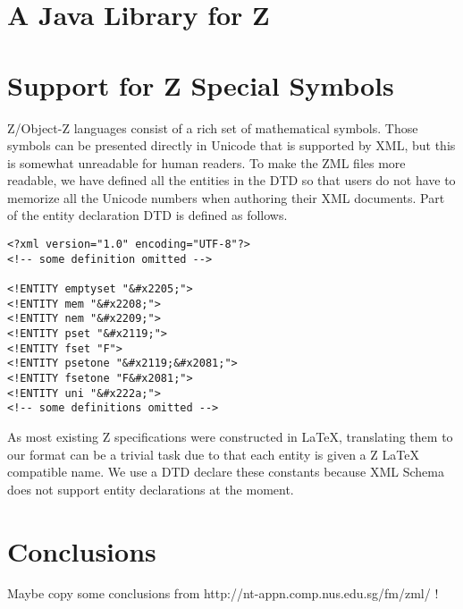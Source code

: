 


\section{A Java Library for Z}


\section{Support for Z Special Symbols}

Z/Object-Z languages consist of a rich set of mathematical symbols. Those
symbols can be presented directly in Unicode that is supported by XML,
but this is somewhat unreadable for human readers.  To make the ZML
files more readable, we have defined all the entities in the DTD so that
users do not have to memorize all the Unicode numbers when authoring their
XML documents. Part of the entity declaration DTD is defined as follows. 

\begin{verbatim} 
<?xml version="1.0" encoding="UTF-8"?>
<!-- some definition omitted -->

<!ENTITY emptyset "&#x2205;">
<!ENTITY mem "&#x2208;">
<!ENTITY nem "&#x2209;">
<!ENTITY pset "&#x2119;">
<!ENTITY fset "F">
<!ENTITY psetone "&#x2119;&#x2081;">
<!ENTITY fsetone "F&#x2081;">
<!ENTITY uni "&#x222a;">
<!-- some definitions omitted -->
\end{verbatim}

As most existing Z specifications were constructed in LaTeX, translating
them to our format can be a trivial task due to that each entity is given a
Z LaTeX compatible name.  We use a DTD declare these constants 
because XML Schema does not support entity declarations at the moment.

 
\section{Conclusions}


  Maybe copy some conclusions from http://nt-appn.comp.nus.edu.sg/fm/zml/ !

